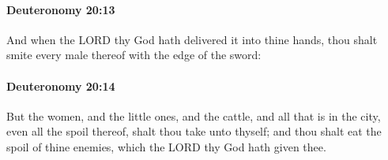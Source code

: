 		\paragraph{Deuteronomy 20:13} %
			\label{DEUTERONOMY-20-13}

			And when the LORD thy God hath delivered it into thine hands, thou shalt smite every male thereof with the edge of the sword:


		\paragraph{Deuteronomy 20:14} %
			\label{DEUTERONOMY-20-14}

			But the women, and the little ones, and the cattle, and all that is in the city, even all the spoil thereof, shalt thou take unto thyself; and thou shalt eat the spoil of thine enemies, which the LORD thy God hath given thee.

